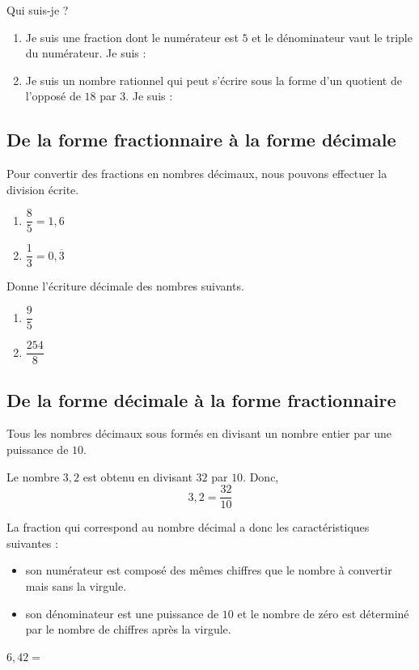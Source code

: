 \documentclass[../math2.tex]{subfiles}
\begin{document}
\begin{exercise}
  Qui suis-je ?
  \begin{enumerate}[itemsep=1em]
    \item Je suis une fraction dont le numérateur est $5$ et le dénominateur vaut le triple du numérateur. Je suis :
    \item Je suis un nombre rationnel qui peut s'écrire sous la forme d'un quotient de l'opposé de $18$ par $3$. Je suis :
  \end{enumerate}
\end{exercise}

\subsection{De la forme fractionnaire à la forme décimale}
Pour convertir des fractions en nombres décimaux, nous pouvons effectuer la division écrite.
\exemples
\begin{enumerate}[cols=2]
  \item $\dfrac{8}{5}=1,6$\medbreak{}
        \columnbreak

  \item $\dfrac{1}{3}=0,\overline{3}$\medbreak{}
\end{enumerate}

\begin{exercise}
  Donne l'écriture décimale des nombres suivants.
  \begin{enumerate}[cols=2]
    \item $\dfrac{9}{5}$
    \item $\dfrac{254}{8}$
  \end{enumerate}
  \vspace{4cm}
\end{exercise}

\newpage
\subsection{De la forme décimale à la forme fractionnaire}
Tous les nombres décimaux sous formés en divisant un nombre entier par une puissance de $10$.

\exemple
Le nombre $3,2$ est obtenu en divisant $32$ par $10$. Donc, \[3,2 = \dfrac{32}{10}\]

La fraction qui correspond au nombre décimal a donc les caractéristiques suivantes :
\begin{itemize}[label=,itemsep=1em]
  \item son numérateur est composé des mêmes chiffres que le nombre à convertir mais sans la virgule.
  \item son dénominateur est une puissance de $10$ et le nombre de zéro est déterminé par le nombre de chiffres après la virgule.
\end{itemize}
\exemple $6,42 = $
\end{document}
